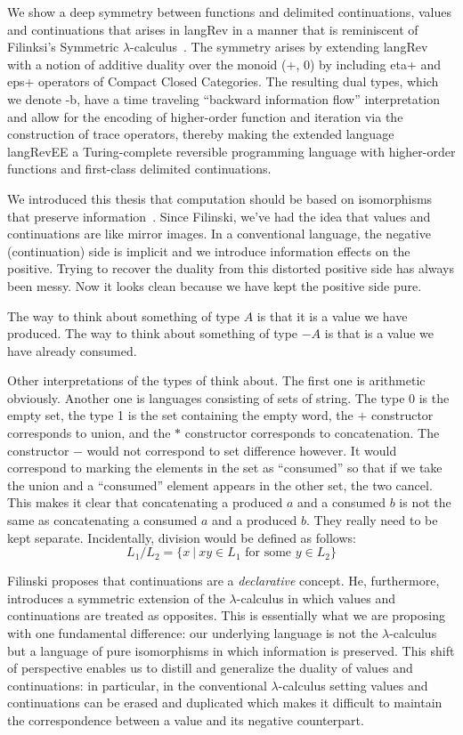 \documentclass[preprint]{sigplanconf}
\newcommand{\lcal}{\ensuremath{\lambda}-calculus}
\begin{document}
We show a deep symmetry between functions and delimited continuations, values
and continuations that arises in {{langRev}} in a manner that is reminiscent
of Filinksi's Symmetric \lcal ~\cite{Filinski:1989:DCI:648332.755574}. The
symmetry arises by extending {{langRev}} with a notion of additive duality
over the monoid {{(+, 0)}} by including {{eta+}} and {{eps+}} operators of
Compact Closed Categories. The resulting dual types, which we denote {{-b}},
have a time traveling ``backward information flow'' interpretation and allow
for the encoding of higher-order function and iteration via the construction
of trace operators, thereby making the extended language {{langRevEE}} a
Turing-complete reversible programming language with higher-order functions
and first-class delimited continuations.

We introduced this thesis that computation should be based on isomorphisms
that preserve information~\cite{infeffects}. Since Filinski, we've had the
idea that values and continuations are like mirror images. In a conventional
language, the negative (continuation) side is implicit and we introduce
information effects on the positive. Trying to recover the duality from this
distorted positive side has always been messy. Now it looks clean because we
have kept the positive side pure.

The way to think about something of type $A$ is that it is a value we have
produced. The way to think about something of type $-A$ is that is a value we
have already consumed. 

Other interpretations of the types of think about. The first one is
arithmetic obviously. Another one is languages consisting of sets of
string. The type 0 is the empty set, the type 1 is the set containing the
empty word, the $+$ constructor corresponds to union, and the $*$ constructor
corresponds to concatenation. The constructor $-$ would not correspond to set
difference however. It would correspond to marking the elements in the set as
``consumed'' so that if we take the union and a ``consumed'' element appears
in the other set, the two cancel. This makes it clear that concatenating a
produced $a$ and a consumed $b$ is not the same as concatenating a consumed
$a$ and a produced $b$. They really need to be kept separate. Incidentally,
division would be defined as follows:
\[
L_1 / L_2 = \{ x ~|~ xy \in L_1 \mbox{~for~some~} y \in L_2 \}
\]

Filinski proposes that continuations are a \emph{declarative} concept. He,
furthermore, introduces a symmetric extension of the $\lambda$-calculus in
which values and continuations are treated as opposites. This is essentially
what we are proposing with one fundamental difference: our underlying
language is not the $\lambda$-calculus but a language of pure isomorphisms in
which information is preserved. This shift of perspective enables us to
distill and generalize the duality of values and continuations: in
particular, in the conventional $\lambda$-calculus setting values and
continuations can be erased and duplicated which makes it difficult to
maintain the correspondence between a value and its negative counterpart.
\end{document}
